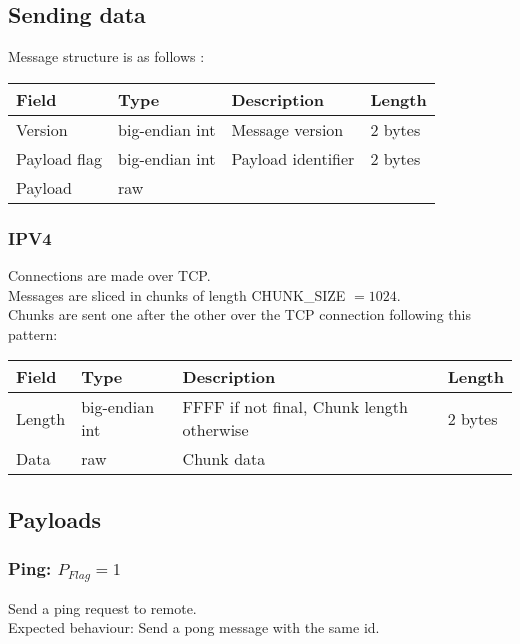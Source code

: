 \documentclass[a4paper,10pt]{article}
\begin{document}
        \subsection{Sending data}
            Message structure is as follows :\\
            \begin{tabularx}{\textwidth}{|l|l|X|l|}
                \hline Field & Type & Description & Length \\ \hline
                \hline Version & big-endian int & Message version & 2 bytes \\
                \hline Payload flag & big-endian int & Payload identifier & 2 bytes \\
                \hline Payload & raw &  & \\
                \hline
            \end{tabularx}
            \subsubsection{IPV4}
                Connections are made over TCP.\\
                Messages are sliced in chunks of length CHUNK\_SIZE $=1024$.\\
                Chunks are sent one after the other over the TCP connection following this pattern:
                
                \noindent\begin{tabularx}{\textwidth}{|l|l|X|l|}
                    \hline Field & Type & Description & Length \\ \hline
                    \hline Length & big-endian int & FFFF if not final, Chunk length otherwise & 2 bytes \\
                    \hline Data & raw & Chunk data & \\
                    \hline
                \end{tabularx}
        \subsection{Payloads}
        
            \subsubsection{Ping: $P_{Flag} = 1$}
                Send a ping request to remote.\\
                Expected behaviour: Send a pong message with the same id.\\
                
\end{document}
